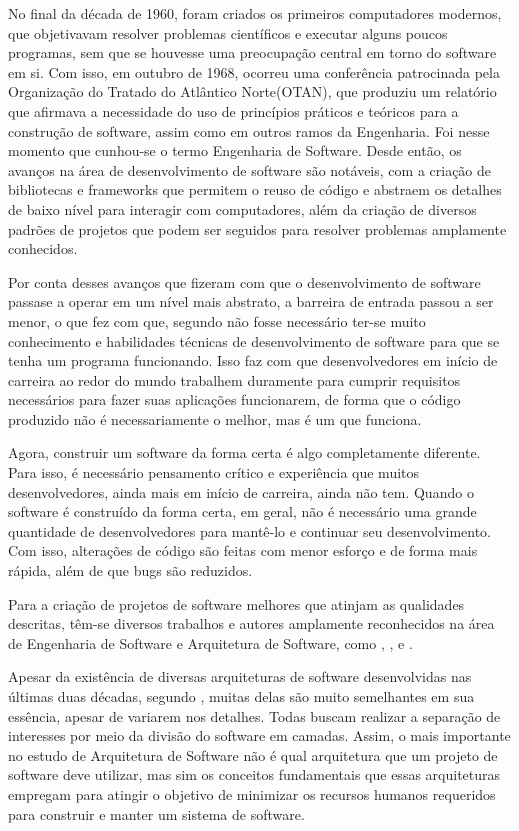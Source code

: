 \documentclass[12pt, %
openright, 
oneside, %
a4paper,    %
brazil]{facom-ufu-abntex2}
\begin{document}
No final da década de 1960, foram criados os primeiros computadores modernos, que objetivavam resolver problemas científicos e executar alguns poucos programas, sem que se houvesse uma preocupação central em torno do software em si. Com isso, em outubro de 1968, ocorreu uma conferência patrocinada pela Organização do Tratado do Atlântico Norte(OTAN), que produziu um relatório que afirmava a necessidade do uso de princípios práticos e teóricos para a construção de software, assim como em outros ramos da Engenharia. Foi nesse momento que cunhou-se o termo Engenharia de Software. Desde então, os avanços na área de desenvolvimento de software são notáveis, com a criação de bibliotecas e frameworks que permitem o reuso de código e abstraem os detalhes de baixo nível para interagir com computadores, além da criação de diversos padrões de projetos que podem ser seguidos para resolver problemas amplamente conhecidos\cite{engsoftmoderna}.

Por conta desses avanços que fizeram com que o desenvolvimento de software passase a operar em um nível mais abstrato, a barreira de entrada passou a ser menor, o que fez com que, segundo  não fosse necessário ter-se muito conhecimento e habilidades técnicas de desenvolvimento de software para que se tenha um programa funcionando. Isso faz com que desenvolvedores em início de carreira ao redor do mundo trabalhem duramente para cumprir requisitos necessários para fazer suas aplicações funcionarem, de forma que o código produzido não é necessariamente o melhor, mas é um que funciona.

Agora, construir um software da forma certa é algo completamente diferente. Para isso, é necessário pensamento crítico e experiência que muitos desenvolvedores, ainda mais em início de carreira, ainda não tem. Quando o software é construído da forma certa, em geral, não é necessário uma grande quantidade de desenvolvedores para mantê-lo e continuar seu desenvolvimento. Com isso, alterações de código são feitas com menor esforço e de forma mais rápida, além de que bugs são reduzidos\cite{Martin17}.

Para a criação de projetos de software melhores que atinjam as qualidades descritas, têm-se diversos trabalhos e autores amplamente reconhecidos na área de Engenharia de Software e Arquitetura de Software, como , ,  e .

Apesar da existência de diversas arquiteturas de software desenvolvidas nas últimas duas décadas, segundo , muitas delas são muito semelhantes em sua essência, apesar de variarem nos detalhes. Todas buscam realizar a separação de interesses por meio da divisão do software em camadas. Assim, o mais importante no estudo de Arquitetura de Software não é qual arquitetura que um projeto de software deve utilizar, mas sim os conceitos fundamentais que essas arquiteturas empregam para atingir o objetivo de minimizar os recursos humanos requeridos para construir e manter um sistema de software\cite{Martin17}.
\end{document}
